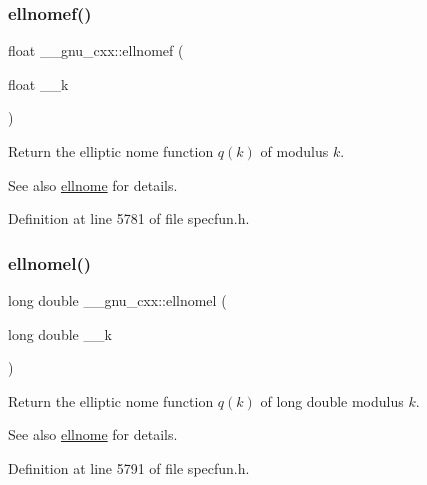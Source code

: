 \subsubsection{\texorpdfstring{ellnomef()}{ellnomef()}}
{\footnotesize\ttfamily float \+\_\+\+\_\+gnu\+\_\+cxx\+::ellnomef (\begin{DoxyParamCaption}\item[{float}]{\+\_\+\+\_\+k }\end{DoxyParamCaption})\hspace{0.3cm}{\ttfamily [inline]}}

Return the elliptic nome function $ q(k) $ of modulus $ k $.

\begin{DoxySeeAlso}{See also}
\hyperlink{group__gnu__math__spec__func_ga7bfb34f8b5c0ed7c72040f9cb7034bba}{ellnome} for details. 
\end{DoxySeeAlso}


Definition at line 5781 of file specfun.\+h.

\mbox{\label{group__gnu__math__spec__func_ga0774570b24f654f8ae39e1865613a4e2}} 
\subsubsection{\texorpdfstring{ellnomel()}{ellnomel()}}
{\footnotesize\ttfamily long double \+\_\+\+\_\+gnu\+\_\+cxx\+::ellnomel (\begin{DoxyParamCaption}\item[{long double}]{\+\_\+\+\_\+k }\end{DoxyParamCaption})\hspace{0.3cm}{\ttfamily [inline]}}

Return the elliptic nome function $ q(k) $ of {\ttfamily long double} modulus $ k $.

\begin{DoxySeeAlso}{See also}
\hyperlink{group__gnu__math__spec__func_ga7bfb34f8b5c0ed7c72040f9cb7034bba}{ellnome} for details. 
\end{DoxySeeAlso}


Definition at line 5791 of file specfun.\+h.

\mbox{\label{group__gnu__math__spec__func_gac956e6457ab7d0d1765d281e73073f55}} 
